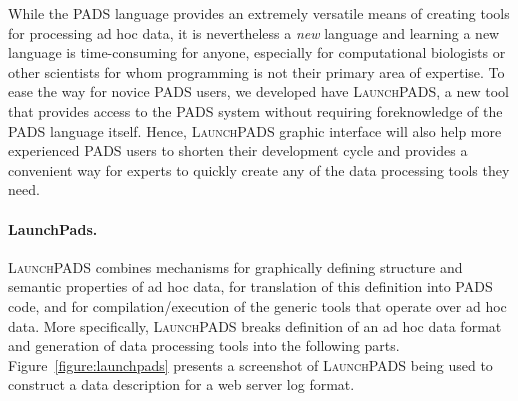 \documentclass[nocopyrightspace]{sigplanconf}
\begin{document}
While the \textsc{PADS} language provides an extremely versatile means
of creating tools for processing ad hoc data, it is nevertheless a
\textit{new} language and learning a new language is time-consuming
for anyone, especially for computational biologists or 
other scientists for whom programming is not their primary
area of expertise.  To ease the way for novice 
\textsc{PADS} users, we developed have \textsc{LaunchPADS},
a new tool that provides access to the PADS system
without requiring foreknowledge of the \textsc{PADS} language itself.
Hence, \textsc{LaunchPADS} graphic interface will also help more
experienced \textsc{PADS} users to shorten their development cycle
and provides a convenient way for experts to quickly create
any of the data processing tools they need.

\paragraph*{LaunchPads.}  \textsc{LaunchPADS} combines mechanisms 
for graphically defining structure and semantic properties of ad hoc data,
for translation of this definition into
\textsc{PADS} code, and for compilation/execution of the generic tools
that operate over ad hoc data.  
More specifically, \textsc{LaunchPADS} breaks definition of an 
ad hoc data format and generation of data processing tools
into the following parts.  Figure~\ref{figure:launchpads}
presents a screenshot of \textsc{LaunchPADS} being used to construct
a data description for a web server log format.
\end{document}
